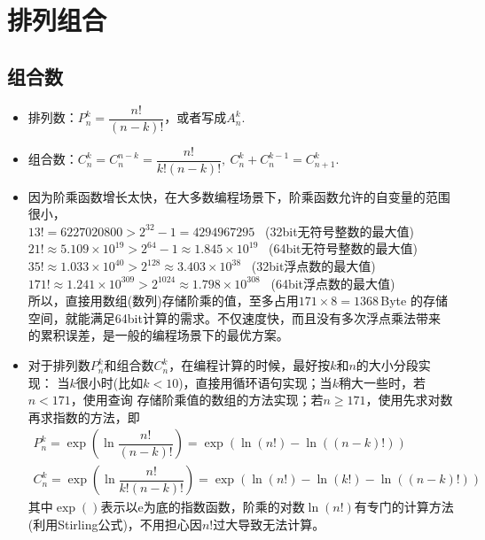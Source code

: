 \chapter{排列组合}

\section{组合数}
\begin{itemize}[leftmargin=\inteval{\myitemleftmargin}pt,itemsep=
   \inteval{\myitemitempsep}pt,topsep=\inteval{\myitemtopsep}pt]
\item 排列数：$ P_n^k=\dfrac{n!}{(n-k)!} $，或者写成$ A_n^k $. 
\item 组合数：$ C_n^k=C_n^{n-k}=\dfrac{n!}{k!(n-k)!},\ 
C_n^k+C_n^{k-1}=C_{n+1}^k $. 

\item 因为阶乘函数增长太快，在大多数编程场景下，阶乘函数允许的自变量的范围很小，\\
$ 13! = 6227020800 >2^{32}-1 = 4294967295$ \ (32bit无符号整数的最大值)  \\
$ 21!\approx 5.109\times 10^{19} >2^{64}-1 \approx  1.845\times 10^{19}$ 
\ (64bit无符号整数的最大值)   \\
$ 35!\approx 1.033\times 10^{40} >2^{128} \approx  3.403\times 10^{38}$ 
\ (32bit浮点数的最大值)  \\
$ 171!\approx 1.241\times 10^{309} >2^{1024} \approx  1.798\times 10^{308}$ 
\ (64bit浮点数的最大值)  \\
所以，直接用数组(数列)存储阶乘的值，至多占用$ 171\times 8 = 1368 $\,Byte
的存储空间，就能满足64bit计算的需求。不仅速度快，而且没有多次浮点乘法带来
的累积误差，是一般的编程场景下的最优方案。

\item 对于排列数$P_n^k$和组合数$C_n^k$，在编程计算的时候，最好按$k$和$n$的大小分段实现：
当$k$很小时(比如$k<10$)，直接用循环语句实现；当$k$稍大一些时，若$n<171$，使用查询
存储阶乘值的数组的方法实现；若$n\geq 171$，使用先求对数再求指数的方法，即
\begin{gather*}
    P_n^k=\exp{\left(\ln \dfrac{n!}{(n-k)!}\right)}=\exp{(\ln(n!)-\ln((n-k)!))} \\
    C_n^k=\exp{\left(\ln \dfrac{n!}{k!(n-k)!}\right)}=\exp{(\ln(n!)-\ln(k!)-\ln((n-k)!))}
\end{gather*}
其中$\exp()$表示以e为底的指数函数，阶乘的对数$\ln(n!)$有专门的计算方法
(利用Stirling公式)，不用担心因$n!$过大导致无法计算。
    

\end{itemize}

